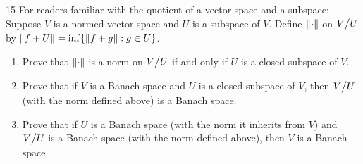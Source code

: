 \begin{exercise}{15}
For readers familiar with the quotient of a vector space and a subspace:
Suppose $V$ is a normed vector space and $U$ is a subspace of $V$.
Define $\left\lVert \cdot\right\rVert$ on ${\textstyle V}\big/{\textstyle U}$ by $\left\lVert f+ U\right\rVert = \inf\{\left\lVert f + g\right\rVert: g \in U\}$.
\begin{enumerate}
    \item Prove that $\left\lVert \cdot\right\rVert$ is a norm on ${\textstyle V}\big/{\textstyle U}$ if and only if $U$ is a closed subspace of $V$.
    \item Prove that if $V$ is a Banach space and $U$ is a closed subspace of $V$, then ${\textstyle V}\big/{\textstyle U}$ (with the norm defined above) is a Banach space.
    \item Prove that if $U$ is a Banach space (with the norm it inherits from $V$) and ${\textstyle V}\big/{\textstyle U}$ is a Banach space (with the norm defined above), then $V$ is a Banach space.
\end{enumerate}
\end{exercise}
